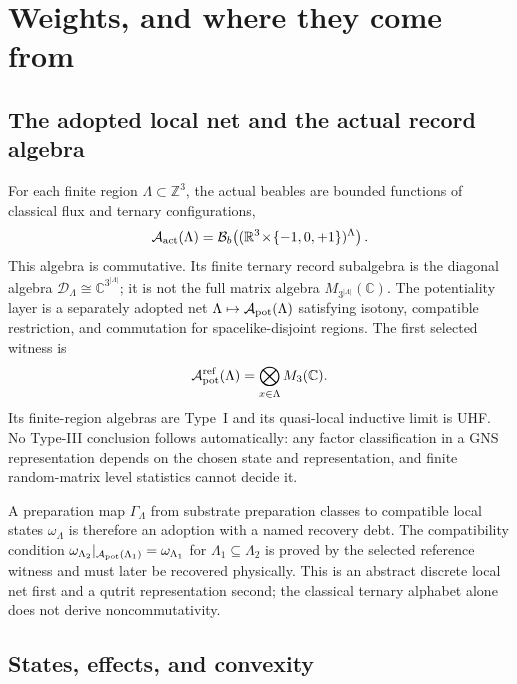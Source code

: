 \documentclass[11pt,a4paper]{article}
\theoremstyle{definition}
\theoremstyle{plain}
\theoremstyle{remark}
\begin{document}
\section{Weights, and where they come from}
\label{sec:operational}

\subsection{The adopted local net and the actual record algebra}

For each finite region $\Lambda\subset\mathbb Z^3$, the actual beables are
bounded functions of classical flux and ternary configurations,
\begin{equation}
 \mathcal A_{\rm act}(\Lambda)=
 \mathcal B_b\!\left((\mathbb R^3\!\times\!\{-1,0,+1\})^\Lambda\right).
 \label{eq:actualalgebra}
\end{equation}
This algebra is commutative. Its finite ternary record subalgebra is the
diagonal algebra
$\mathcal D_\Lambda\cong\mathbb C^{3^{|\Lambda|}}$; it is not the full matrix
algebra $M_{3^{|\Lambda|}}(\mathbb C)$. The potentiality layer is a separately
adopted net $\Lambda\mapsto\mathcal A_{\rm pot}(\Lambda)$ satisfying isotony,
compatible restriction, and commutation for spacelike-disjoint regions. The
first selected witness is
\begin{equation}
 \mathcal A_{\rm pot}^{\rm ref}(\Lambda)=
 \bigotimes_{x\in\Lambda}M_3(\mathbb C).
 \label{eq:qutritnet}
\end{equation}
Its finite-region algebras are Type~I and its quasi-local inductive limit is
UHF. No Type-III conclusion follows automatically: any factor classification
in a GNS representation depends on the chosen state and representation, and
finite random-matrix level statistics cannot decide it.

A preparation map $\Gamma_\Lambda$ from substrate preparation classes to
compatible local states $\omega_\Lambda$ is therefore an adoption with a
named recovery debt. The compatibility condition
$\omega_{\Lambda_2}|_{\mathcal A_{\rm pot}(\Lambda_1)}=
\omega_{\Lambda_1}$ for $\Lambda_1\subseteq\Lambda_2$ is proved by the
selected reference witness and must later be recovered physically. This is an
abstract discrete local net first and a qutrit representation second; the
classical ternary alphabet alone does not derive noncommutativity.

\subsection{States, effects, and convexity}
\end{document}
